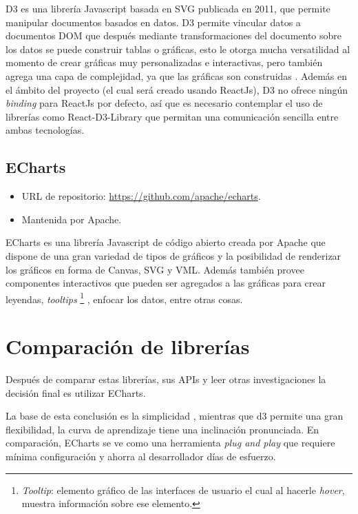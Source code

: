 D3 es una librería Javascript basada en SVG publicada en 2011, que permite manipular documentos basados en datos. D3 permite vincular datos a documentos DOM que después mediante transformaciones del documento sobre los datos se puede construir tablas o gráficas, esto le otorga mucha versatilidad al momento de crear gráficas muy personalizadas e interactivas, pero también agrega una capa de complejidad, ya que las gráficas son construidas . Además en el ámbito del proyecto (el cual será creado usando ReactJs), D3 no ofrece ningún \textit{binding} para ReactJs por defecto, así que es necesario contemplar el uso de librerías como React-D3-Library\cite{ReactD3Library} que permitan una comunicación sencilla entre ambas tecnologías. 

\subsection{ ECharts }
\begin{itemize}
    \item URL de repositorio: \href{https://github.com/apache/echarts}{https://github.com/apache/echarts}.
    \item Mantenida por Apache.
\end{itemize}

ECharts es una librería Javascript de código abierto creada por Apache que dispone de una gran variedad de tipos de gráficos y la posibilidad de renderizar los gráficos en forma de Canvas, SVG y VML. Además también provee componentes interactivos  que pueden ser agregados a las gráficas para crear leyendas, \textit{tooltips} \footnote{\textit{Tooltip}: elemento gráfico de las interfaces de usuario el cual al hacerle \textit{hover}, muestra información sobre ese elemento.} , enfocar los datos, entre otras cosas.

\section{ Comparación de librerías }

Después de comparar estas librerías, sus APIs y leer otras investigaciones la decisión final es utilizar ECharts.

La base de esta conclusión es la simplicidad \cite{EchartsDecision}, mientras que d3 permite una gran flexibilidad, la curva de aprendizaje tiene una inclinación pronunciada. 
En comparación, ECharts se ve como una herramienta \textit{plug and play} que requiere mínima configuración y ahorra al desarrollador días de esfuerzo.

